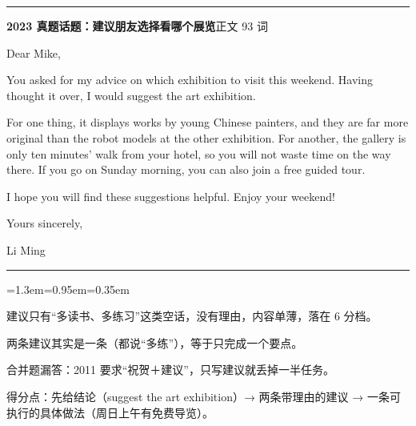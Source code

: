 \documentclass[10pt,a4paper]{ctexart}
\begin{document}
{\color{rule}\rule{\linewidth}{0.6pt}}\par\nopagebreak
\vspace{1pt}
\vspace{2pt}\noindent\colorbox{soft}{\parbox{\dimexpr\linewidth-2\fboxsep\relax}{%
\vspace{2pt}
{\footnotesize\bfseries\color{accent}2023 真题话题：建议朋友选择看哪个展览}\hfill{\footnotesize\color{gray}正文 93 词}
\par\vspace{2pt}
\footnotesize Dear Mike,\par
\footnotesize You asked for my advice on which exhibition to visit this weekend. Having thought it over, I would suggest the art exhibition.\par
\footnotesize For one thing, it displays works by young Chinese painters, and they are far more original than the robot models at the other exhibition. For another, the gallery is only ten minutes' walk from your hotel, so you will not waste time on the way there. If you go on Sunday morning, you can also join a free guided tour.\par
\footnotesize I hope you will find these suggestions helpful. Enjoy your weekend!\par
\footnotesize Yours sincerely,\par
\footnotesize Li Ming\par
\par{}
\par\vspace{1pt}}}\par
\vspace{2pt}
\vspace{4pt}\par\nopagebreak
{\color{rule}\rule{\linewidth}{0.6pt}}\par\nopagebreak
\vspace{1pt}
\vspace{1pt}\begingroup\setlength{\parindent}{0pt}
\begin{list}{}{\leftmargin=1.3em=0.95em=0.35em\itemindent=0pt\topsep=0pt\partopsep=0pt\parsep=1.5pt\itemsep=0pt}
\item[{\color{warn}\scriptsize$\blacksquare$}]{\footnotesize 建议只有“多读书、多练习”这类空话，没有理由，内容单薄，落在 6 分档。}
\item[{\color{warn}\scriptsize$\blacksquare$}]{\footnotesize 两条建议其实是一条（都说“多练”），等于只完成一个要点。}
\item[{\color{warn}\scriptsize$\blacksquare$}]{\footnotesize 合并题漏答：2011 要求“祝贺＋建议”，只写建议就丢掉一半任务。}
\item[{\color{warn}\scriptsize$\blacksquare$}]{\footnotesize 得分点：先给结论（suggest the art exhibition）→ 两条带理由的建议 → 一条可执行的具体做法（周日上午有免费导览）。}
\end{list}
\end{document}
